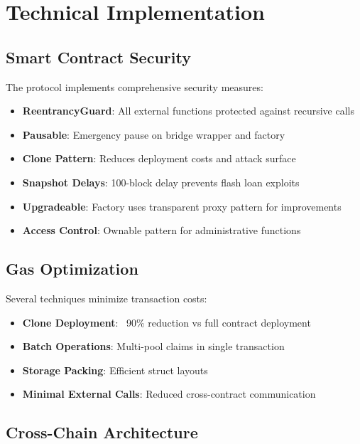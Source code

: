 \documentclass{article}
\begin{document}
\section{Technical Implementation}

\subsection{Smart Contract Security}

The protocol implements comprehensive security measures:

\begin{itemize}
    \item \textbf{ReentrancyGuard}: All external functions protected against recursive calls
    \item \textbf{Pausable}: Emergency pause on bridge wrapper and factory
    \item \textbf{Clone Pattern}: Reduces deployment costs and attack surface
    \item \textbf{Snapshot Delays}: 100-block delay prevents flash loan exploits
    \item \textbf{Upgradeable}: Factory uses transparent proxy pattern for improvements
    \item \textbf{Access Control}: Ownable pattern for administrative functions
\end{itemize}

\subsection{Gas Optimization}

Several techniques minimize transaction costs:

\begin{itemize}
    \item \textbf{Clone Deployment}: ~90\% reduction vs full contract deployment
    \item \textbf{Batch Operations}: Multi-pool claims in single transaction
    \item \textbf{Storage Packing}: Efficient struct layouts
    \item \textbf{Minimal External Calls}: Reduced cross-contract communication
\end{itemize}

\subsection{Cross-Chain Architecture}
\end{document}
